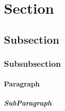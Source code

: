 \documentclass[titlepage]{article}
\begin{document}
\tableofcontents

\section{Section}
\subsection{Subsection}
\subsubsection{Subsubsection}
\paragraph{Paragraph}
\subparagraph{SubParagraph}
\end{document}
